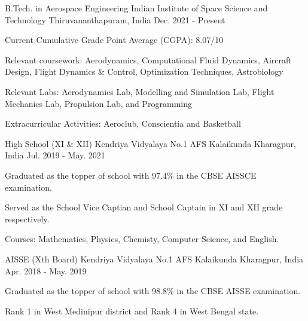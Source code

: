

\begin{cventries}

  \cventry
  {B.Tech. in Aerospace Engineering} %
  {Indian Institute of Space Science and Technology} %
  {Thiruvananthapuram, India} %
  {Dec. 2021 - Present} %
  {
    \begin{cvitems} %
      \item {Current Cumulative Grade Point Average (CGPA): 8.07/10}
      \item {Relevant coursework: Aerodynamics, Computational Fluid Dynamics, Aircraft Design, Flight Dynamics \& Control, Optimization Techniques, Astrobiology}
      \item {Relevant Labs: Aerodynamics Lab, Modelling and Simulation Lab, Flight Mechanics Lab, Propulsion Lab, and Programming}
      \item {Extracurricular Activities: Aeroclub, Conscientia and Basketball}
    \end{cvitems}
  }

  \cventry
  {High School (XI \& XII)} %
  {Kendriya Vidyalaya No.1 AFS Kalaikunda} %
  {Kharagpur, India} %
  {Jul. 2019 - May. 2021} %
  {
    \begin{cvitems} %
      \item {Graduated as the topper of school with 97.4\% in the CBSE AISSCE examination.}
      \item {Served as the School Vice Captian and School Captain in XI and XII grade respectively.}
      \item {Courses: Mathematics, Physics, Chemisty, Computer Science, and English.}
    \end{cvitems}
  }

  \cventry
  {AISSE (Xth Board)} %
  {Kendriya Vidyalaya No.1 AFS Kalaikunda} %
  {Kharagpur, India} %
  {Apr. 2018 - May. 2019} %
  {
    \begin{cvitems} %
      \item {Graduated as the topper of school with 98.8\% in the CBSE AISSE examination.}
      \item {Rank 1 in West Medinipur district and Rank 4 in West Bengal state.}
    \end{cvitems}
  }

\end{cventries}
